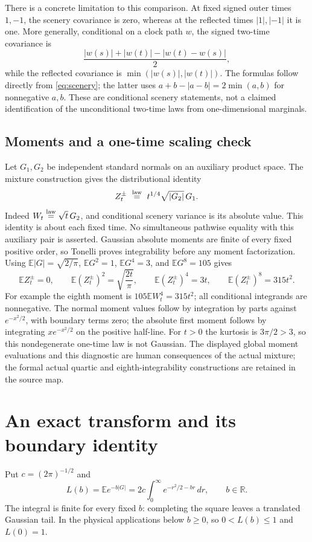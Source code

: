 \documentclass[11pt]{article}
\newcommand{\R}{\mathbb R}
\newcommand{\E}{\mathbb E}
\begin{document}
There is a concrete limitation to this comparison. At fixed signed
outer times $1,-1$, the scenery covariance is zero, whereas at the
reflected times $|1|,|-1|$ it is one. More generally, conditional on
a clock path $w$, the signed two-time covariance is
\[
 \frac{|w(s)|+|w(t)|-|w(t)-w(s)|}{2},
\]
while the reflected covariance is $\min(|w(s)|,|w(t)|)$.
The formulas follow directly from \eqref{eq:scenery}; the latter
uses $a+b-|a-b|=2\min(a,b)$ for nonnegative $a,b$.
These are conditional scenery statements, not a claimed identification
of the unconditional two-time laws from one-dimensional marginals.

\subsection*{Moments and a one-time scaling check}
Let $G_1,G_2$ be independent standard normals on an auxiliary product
space. The mixture construction gives the distributional identity
\[
 Z_t^\pm\ \stackrel{\rm law}=\ t^{1/4}\sqrt{|G_2|}\,G_1.
\]
Indeed $W_t\stackrel{\rm law}=\sqrt t\,G_2$, and conditional
scenery variance is its absolute value. This identity is about each
fixed time. No simultaneous pathwise equality with this auxiliary
pair is asserted.
Gaussian absolute moments are finite of every fixed positive order,
so Tonelli proves integrability before any moment factorization.
Using $\E|G|=\sqrt{2/\pi}$, $\E G^2=1$,
$\E G^4=3$, and $\E G^8=105$ gives
\begin{equation}\label{eq:moments}
 \E Z_t^\pm=0,\qquad
 \E(Z_t^\pm)^2=\sqrt{\frac{2t}{\pi}},\qquad
 \E(Z_t^\pm)^4=3t,\qquad
 \E(Z_t^\pm)^8=315t^2.
\end{equation}
For example the eighth moment is $105\E W_t^4=315t^2$;
all conditional integrands are nonnegative. The normal moment values
follow by integration by parts against $e^{-x^2/2}$, with boundary
terms zero; the absolute first moment follows by integrating
$x e^{-x^2/2}$ on the positive half-line. For $t>0$ the kurtosis is
$3\pi/2>3$, so this nondegenerate one-time law is not Gaussian.
The displayed global moment evaluations and this diagnostic are human
consequences of the actual mixture; the formal actual quartic and
eighth-integrability constructions are retained in the source map.

\section{An exact transform and its boundary identity}
Put $c=(2\pi)^{-1/2}$ and
\[
 L(b)=\E e^{-b|G|}=2c\int_0^\infty e^{-r^2/2-br}\,dr,
 \qquad b\in\R.
\]
The integral is finite for every fixed $b$: completing the square
leaves a translated Gaussian tail. In the physical applications
below $b\geq0$, so $0<L(b)\leq1$ and $L(0)=1$.
\end{document}
